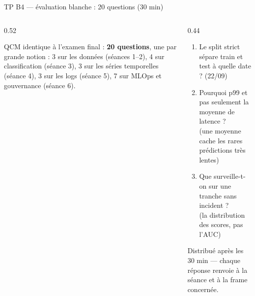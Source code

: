 \begin{frame}{TP B4 --- évaluation blanche : 20 questions (30 min)}
\small
\begin{columns}[t]
\begin{column}{0.52\textwidth}
\begin{ebox}[Format]
QCM identique à l'examen final : \textbf{20 questions}, une par grande
notion : 3 sur les données (séances 1--2), 4 sur classification (séance 3),
3 sur les séries temporelles (séance 4), 3 sur les logs (séance 5),
7 sur MLOps et gouvernance (séance 6).
\end{ebox}
\end{column}
\begin{column}{0.44\textwidth}
\small\begin{kbox}
\begin{enumerate}
\item Le split strict sépare train et test à quelle date ? \hfill (22/09)
\item Pourquoi p99 et pas seulement la moyenne de latence ?\\
(une moyenne cache les rares prédictions très lentes)
\item Que surveille-t-on sur une tranche sans incident ?\\
(la distribution des scores, pas l'AUC)
\end{enumerate}
\end{kbox}
\begin{solbox}[Corrigé]
Distribué après les 30 min --- chaque réponse renvoie à la séance et à la
frame concernée.
\end{solbox}
\end{column}
\end{columns}
\end{frame}
